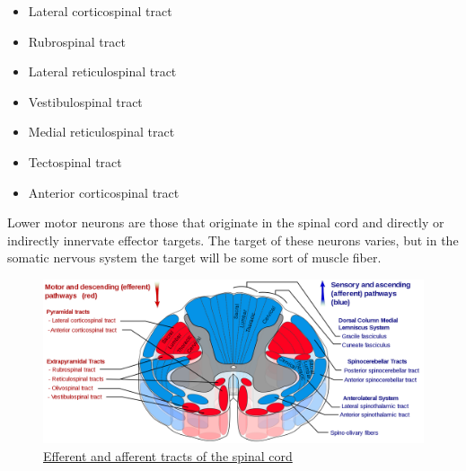 \begin{itemize}
\tightlist
\item
  Lateral corticospinal tract
\item
  Rubrospinal tract
\item
  Lateral reticulospinal tract
\item
  Vestibulospinal tract
\item
  Medial reticulospinal tract
\item
  Tectospinal tract
\item
  Anterior corticospinal tract
\end{itemize}

Lower motor neurons are those that originate in the spinal cord and directly or indirectly innervate effector targets. The target of these neurons varies, but in the somatic nervous system the target will be some sort of muscle fiber.



\begin{figure}

{\centering \includegraphics[width=0.7\linewidth]{./figures/cns/Spinal_cord_tracts_-_English} 

}

\caption{\href{https://commons.wikimedia.org/wiki/File:Spinal_cord_tracts_-_English.svg}{Efferent and afferent tracts of the spinal cord}}\label{fig:spinaltracts}
\end{figure}

